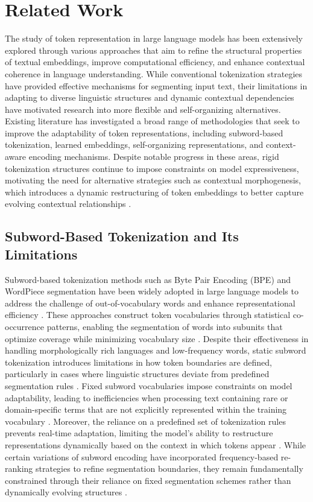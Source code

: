 \section{Related Work}
The study of token representation in large language models has been extensively explored through various approaches that aim to refine the structural properties of textual embeddings, improve computational efficiency, and enhance contextual coherence in language understanding. While conventional tokenization strategies have provided effective mechanisms for segmenting input text, their limitations in adapting to diverse linguistic structures and dynamic contextual dependencies have motivated research into more flexible and self-organizing alternatives. Existing literature has investigated a broad range of methodologies that seek to improve the adaptability of token representations, including subword-based tokenization, learned embeddings, self-organizing representations, and context-aware encoding mechanisms. Despite notable progress in these areas, rigid tokenization structures continue to impose constraints on model expressiveness, motivating the need for alternative strategies such as contextual morphogenesis, which introduces a dynamic restructuring of token embeddings to better capture evolving contextual relationships \cite{roe2024semantic}.

\subsection{Subword-Based Tokenization and Its Limitations}

Subword-based tokenization methods such as Byte Pair Encoding (BPE) and WordPiece segmentation have been widely adopted in large language models to address the challenge of out-of-vocabulary words and enhance representational efficiency \cite{aturd2024dynamic}. These approaches construct token vocabularies through statistical co-occurrence patterns, enabling the segmentation of words into subunits that optimize coverage while minimizing vocabulary size \cite{zhang2024grounding}. Despite their effectiveness in handling morphologically rich languages and low-frequency words, static subword tokenization introduces limitations in how token boundaries are defined, particularly in cases where linguistic structures deviate from predefined segmentation rules \cite{huang2024measuring}. Fixed subword vocabularies impose constraints on model adaptability, leading to inefficiencies when processing text containing rare or domain-specific terms that are not explicitly represented within the training vocabulary \cite{verscaj2024innovative}. Moreover, the reliance on a predefined set of tokenization rules prevents real-time adaptation, limiting the model’s ability to restructure representations dynamically based on the context in which tokens appear \cite{fouqun2024contextual}. While certain variations of subword encoding have incorporated frequency-based re-ranking strategies to refine segmentation boundaries, they remain fundamentally constrained through their reliance on fixed segmentation schemes rather than dynamically evolving structures \cite{hu2024dynamic}.

